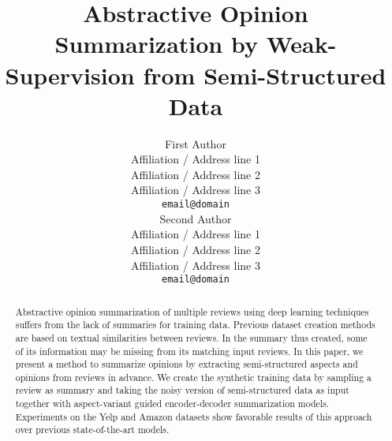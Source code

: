 \documentclass[11pt,a4paper]{article}
\title{Abstractive Opinion Summarization by Weak-Supervision from
Semi-Structured Data}
\author{First Author \\
  Affiliation / Address line 1 \\
  Affiliation / Address line 2 \\
  Affiliation / Address line 3 \\
  \texttt{email@domain} \\\And
  Second Author \\
  Affiliation / Address line 1 \\
  Affiliation / Address line 2 \\
  Affiliation / Address line 3 \\
  \texttt{email@domain} \\}
\date{}
\newcommand{\cut}[1]{}
\newcommand{\KZ}[1]{\textcolor{blue}{Kenny: #1}}
\begin{document}
\maketitle

\begin{abstract}
Abstractive opinion summarization of multiple reviews
 using deep learning techniques suffers from the lack 
of summaries for training data.
Previous dataset creation methods are based on
textual similarities between reviews.
In the summary thus created, some of its information may be
missing from its matching input reviews.
In this paper, 
we present a method to summarize opinions by
extracting semi-structured aspects and opinions from reviews
in advance. We create the synthetic training data by sampling 
a review as summary and taking the noisy version of 
semi-structured data as input together 
with aspect-variant guided encoder-decoder 
summarization models.
Experiments on the Yelp and Amazon datasets show 
favorable results of this approach over
previous state-of-the-art models.
\cut{%
we present a semi-structured review that consists of
opinion-aspect pairs extracted from the review
and sentences without opinion-aspect pairs.
We create the synthetic training data 
by sampling a review as summary and
generating the noisy version of semi-structured summary 
as semi-structured multiple reviews. 
We introduce variant aspect guided summarization models
for producing summaries from semi-structured multiple reviews.
}%
\cut{%
	Abstractive opinion summarization using deep learning techniques lacks training data. Previous dataset creation methods always select summary and its multi-review by the textual similarity between reviews.
	However, summary and its multi-review in these datasets are inconsistent in aspect and opinion.
	In this paper, we represent a review by extracted opinion-aspect pairs (OAs) of this review and other sentences (OSs) without extracted OAs. We design a data aggregation heuristics to sample a review as summary and generate noisy versions of OAs and OSs as input to simulate them in actual multi-review. We propose an aspect guided encoder-decoder model to generate summary from selected OAs and OSs. The results shows that our model outperforms the state-of-the-art models on Yelp and Amazon.
}%
\end{abstract}






 




\end{document}
